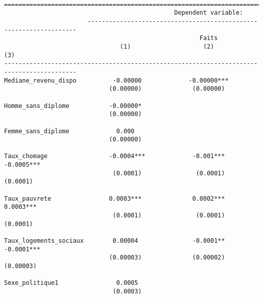 \documentclass[
]{article}
\begin{document}
\begin{verbatim}

==========================================================================================
                                               Dependent variable:                        
                       -------------------------------------------------------------------
                                                      Faits                               
                                (1)                    (2)                    (3)         
------------------------------------------------------------------------------------------
Mediane_revenu_dispo          -0.00000             -0.00000***                            
                             (0.00000)              (0.00000)                             
                                                                                          
Homme_sans_diplome           -0.00000*                                                    
                             (0.00000)                                                    
                                                                                          
Femme_sans_diplome             0.000                                                      
                             (0.00000)                                                    
                                                                                          
Taux_chomage                 -0.0004***             -0.001***             -0.0005***      
                              (0.0001)               (0.0001)              (0.0001)       
                                                                                          
Taux_pauvrete                0.0003***              0.0002***              0.0003***      
                              (0.0001)               (0.0001)              (0.0001)       
                                                                                          
Taux_logements_sociaux        0.00004               -0.0001**             -0.0001***      
                             (0.00003)              (0.00002)              (0.00003)      
                                                                                          
Sexe_politique1                0.0005                                                     
                              (0.0003)                                                    
                                                                                          

\end{verbatim}
\end{document}
